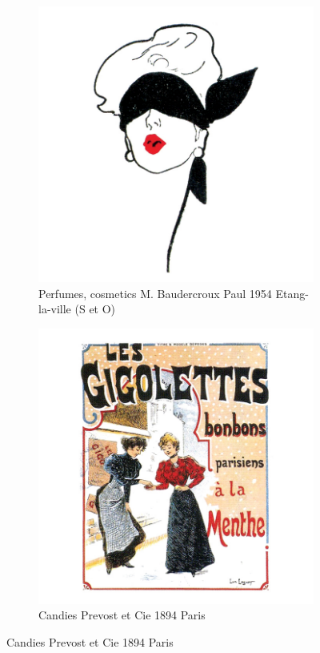 \begin{figure}[h]
  \begin{subfigure}{.45\textwidth}
    \centering
    \includegraphics[width=.5\linewidth]{images/supplement/trademarks/french/21_32}
    \caption[]{Perfumes, cosmetics M. Baudercroux Paul 1954 Etang-la-ville (S et O)}
    \label{fig:trademarks:french:21.32}
  \end{subfigure}\hfill
  \begin{subfigure}{.45\textwidth}
    \centering
    \includegraphics[width=.5\linewidth]{images/supplement/trademarks/french/21_34}
    \caption[]{Candies Prevost et Cie 1894 Paris}
    \label{fig:trademarks:french:21.34}
  \end{subfigure}
\end{figure}

